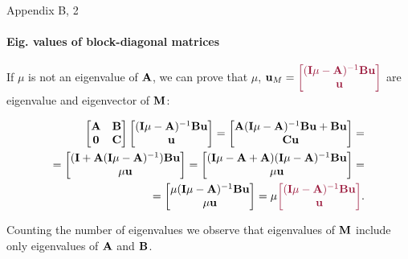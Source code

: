 \documentclass{beamer}
\begin{document}
\begin{frame}{Appendix B, 2}
	\framesubtitle{Eig. values of block-diagonal matrices}
	\begin{flushleft}
		
		If $\mu$ is not an eigenvalue of $\mathbf{A}$, we can prove that $\mu$, $\bo{u}_M = \textcolor{mydarkpink}{\begin{bmatrix}
				(\bo{I}\mu - \bo{A})^{-1} \bo{B} \bo{u}  \\  \bo{u} 
		\end{bmatrix}}$ are eigenvalue and eigenvector of $\mathbf{M}$:
	
		\begin{align*}
	\begin{bmatrix}
		\bo{A} & \bo{B} \\ \bo{0} & \bo{C}
	\end{bmatrix}
\begin{bmatrix}
	(\bo{I}\mu - \bo{A})^{-1}\bo{B} \bo{u}  \\  \bo{u} 
\end{bmatrix}
	=
	\begin{bmatrix}
		\bo{A}(\bo{I}\mu - \bo{A})^{-1}\bo{B} \bo{u} + \bo{B} \bo{u}
		 \\ 
		 \bo{C}\bo{u}
	\end{bmatrix}
	= \\
	=
	\begin{bmatrix}
		(\bo{I}+\bo{A}(\bo{I}\mu - \bo{A})^{-1}) \bo{B} \bo{u}
		\\ 
		\mu \bo{u}
	\end{bmatrix} 
=
	\begin{bmatrix}
	(\bo{I}\mu - \bo{A}+\bo{A})(\bo{I}\mu - \bo{A})^{-1} \bo{B} \bo{u}
	\\ 
	\mu \bo{u}
	\end{bmatrix} 
= \\
=
	\begin{bmatrix}
	\mu(\bo{I}\mu - \bo{A})^{-1} \bo{B} \bo{u}
	\\ 
	\mu \bo{u}
	\end{bmatrix} 
=
\mu 
\textcolor{mydarkpink}{
\begin{bmatrix}
(\bo{I}\mu - \bo{A})^{-1} \bo{B} \bo{u}
\\ 
\bo{u}
\end{bmatrix} 
}.
	\end{align*}	
	
	
	
	Counting the number of eigenvalues we observe that eigenvalues of $\mathbf{M}$ include only eigenvalues of $\mathbf{A}$ and $\mathbf{B}$.
		
	\end{flushleft}
\end{frame}
\end{document}
